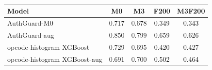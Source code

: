 \begin{tabular}{lcccc}
\toprule
Model & M0 & M3 & F200 & M3F200 \\
\midrule
AuthGuard-M0 & 0.717 & 0.678 & 0.349 & 0.343 \\
AuthGuard-aug & 0.850 & 0.799 & 0.659 & 0.626 \\
opcode-histogram XGBoost & 0.729 & 0.695 & 0.420 & 0.427 \\
opcode-histogram XGBoost-aug & 0.691 & 0.700 & 0.502 & 0.464 \\
\bottomrule
\end{tabular}
